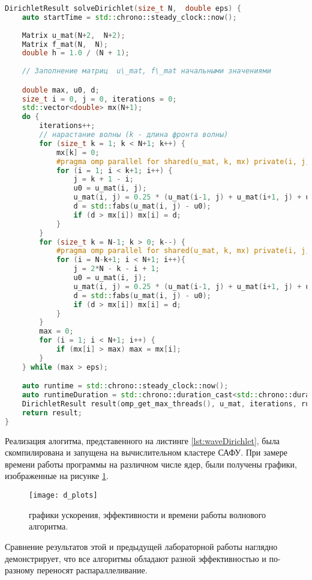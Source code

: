 \documentclass[13pt]{article}
\begin{document}
	\begin{lstlisting}[language=C++, caption={Два способа обхода матрицы}, label={lst:waveDirichlet}, texcl=true]
DirichletResult solveDirichlet(size_t N,  double eps) {
	auto startTime = std::chrono::steady_clock::now();
	
	Matrix u_mat(N+2,  N+2);
	Matrix f_mat(N,  N);
	double h = 1.0 / (N + 1);
	
	// Заполнение матриц  u\_mat, f\_mat начальными значениями 

	double max, u0, d;
	size_t i = 0, j = 0, iterations = 0;
	std::vector<double> mx(N+1);
	do {
		iterations++;
		// нарастание волны (k - длина фронта волны)
		for (size_t k = 1; k < N+1; k++) {
			mx[k] = 0;
			#pragma omp parallel for shared(u_mat, k, mx) private(i, j, u0, d) schedule(static, 1)
			for (i = 1; i < k+1; i++) {
				j = k + 1 - i;
				u0 = u_mat(i, j);
				u_mat(i, j) = 0.25 * (u_mat(i-1, j) + u_mat(i+1, j) + u_mat(i, j-1) + u_mat(i, j+1) - h*h*f_mat(i-1, j-1));
				d = std::fabs(u_mat(i, j) - u0);
				if (d > mx[i]) mx[i] = d;
			}
		}
		for (size_t k = N-1; k > 0; k--) {
			#pragma omp parallel for shared(u_mat, k, mx) private(i, j, u0, d) schedule(static, 1)
			for (i = N-k+1; i < N+1; i++){
				j = 2*N - k - i + 1;
				u0 = u_mat(i, j);
				u_mat(i, j) = 0.25 * (u_mat(i-1, j) + u_mat(i+1, j) + u_mat(i, j-1) + u_mat(i, j+1) - h*h*f_mat(i-1, j-1));
				d = std::fabs(u_mat(i, j) - u0);
				if (d > mx[i]) mx[i] = d;				
			}
		}
		max = 0;
		for (i = 1; i < N+1; i++) {
			if (mx[i] > max) max = mx[i];
		}
	} while (max > eps);

	auto runtime = std::chrono::steady_clock::now();
	auto runtimeDuration = std::chrono::duration_cast<std::chrono::duration<double>>(runtime - startTime);
	DirichletResult result(omp_get_max_threads(), u_mat, iterations, runtimeDuration.count(), eps);
	return result;
}
	\end{lstlisting}
	
	Реализация алогитма, представенного на листинге \ref{lst:waveDirichlet}, была скомпилирована и запущена на вычислительном кластере САФУ. При замере времени работы программы на различном числе ядер, были получены графики, изображенные на рисунке \ref{fig:dplots}.
	
	\begin{figure}[h]
		\centering		\texttt{[image: d\_plots]}
		\caption{графики ускорения, эффективности и времени работы волнового алгоритма.}
		\label{fig:dplots} 
	\end{figure}
	
	Сравнение результатов этой и предыдущей лабораторной работы наглядно демонстрирует, что все алгоритмы обладают разной эффективностью и по-разному переносят распараллеливание. 
\end{document}
